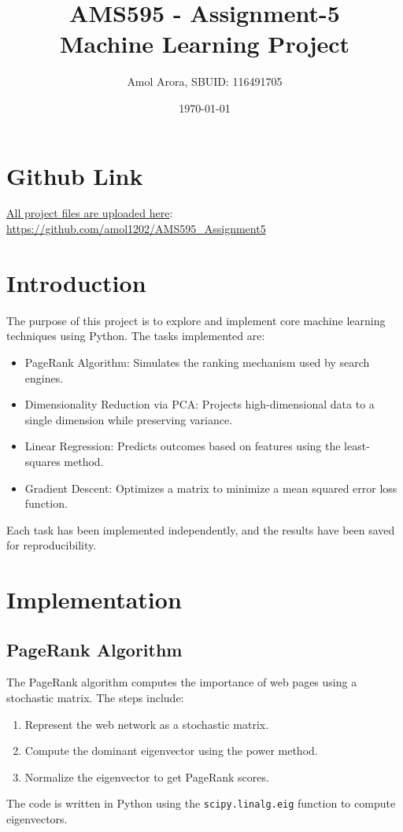 \documentclass[a4paper,12pt]{article}
\title{\textbf{AMS595 - Assignment-5}\\ \large Machine Learning Project}
\author{Amol Arora, SBUID: 116491705}
\date{\today}
\begin{document}
\maketitle

\section{Github Link}
\underline{All project files are uploaded here}:
\url{https://github.com/amol1202/AMS595_Assignment5}

\section{Introduction}
The purpose of this project is to explore and implement core machine learning techniques using Python. The tasks implemented are:
\begin{itemize}
    \item PageRank Algorithm: Simulates the ranking mechanism used by search engines.
    \item Dimensionality Reduction via PCA: Projects high-dimensional data to a single dimension while preserving variance.
    \item Linear Regression: Predicts outcomes based on features using the least-squares method.
    \item Gradient Descent: Optimizes a matrix to minimize a mean squared error loss function.
\end{itemize}

Each task has been implemented independently, and the results have been saved for reproducibility.

\section{Implementation}

\subsection{PageRank Algorithm}
The PageRank algorithm computes the importance of web pages using a stochastic matrix. The steps include:
\begin{enumerate}
    \item Represent the web network as a stochastic matrix.
    \item Compute the dominant eigenvector using the power method.
    \item Normalize the eigenvector to get PageRank scores.
\end{enumerate}
The code is written in Python using the \texttt{scipy.linalg.eig} function to compute eigenvectors.
\end{document}
